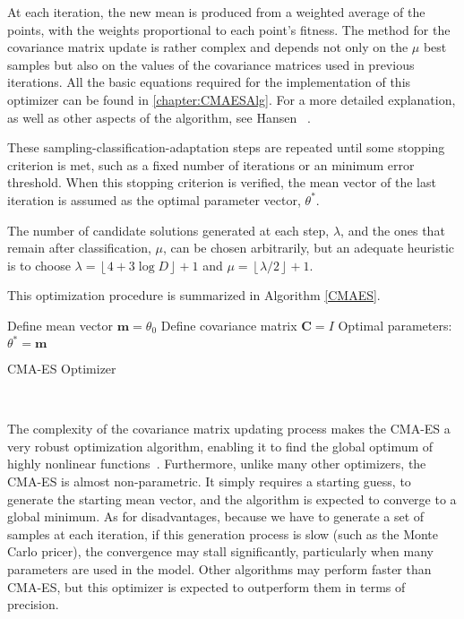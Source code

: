 At each iteration, the new mean is produced from a weighted average of the points, with the weights proportional to each point's fitness.
The method for the covariance matrix update is rather complex and depends not only on the $\mu$ best samples but also on the values of the covariance matrices used in previous iterations. All the basic equations required for the implementation of this optimizer can be found in \autoref{chapter:CMAESAlg}. For a more detailed explanation, as well as other aspects of the algorithm, see Hansen ~\citep{Hansen}.

These sampling-classification-adaptation steps are repeated until some stopping criterion is met, such as a fixed number of iterations or an minimum error threshold.
When this stopping criterion is verified, the mean vector of the last iteration is assumed as the optimal parameter vector, $\theta^{*}$.


The number of candidate solutions generated at each step, $\lambda$, and the ones that remain after classification, $\mu$, can be chosen arbitrarily, but an adequate heuristic is to choose $\lambda=\left\lfloor4+3\log D\right\rfloor+1$ and $\mu=\left\lfloor\lambda/2\right\rfloor+1$.

This optimization procedure is summarized in Algorithm \ref{CMAES}.

\begin{algorithm}[H]\label{CMAES}
\DontPrintSemicolon
Define mean vector $\mathbf{m}=\theta_0$
Define covariance matrix $\mathbf{C}=I$\;
 Optimal parameters: $\theta^{*}=\mathbf{m}$\;
 \caption{CMA-ES Optimizer}
\end{algorithm}
\

The complexity of the covariance matrix updating process makes the CMA-ES a very robust optimization algorithm, enabling it to find the global optimum of highly nonlinear functions~\citep{DilaoCMA}.
Furthermore, unlike many other optimizers, the CMA-ES is almost non-parametric. It simply requires a starting guess, to generate the starting mean vector, and the algorithm is expected to converge to a global minimum.
As for disadvantages, because we have to generate a set of samples at each iteration, if this generation process is slow (such as the Monte Carlo pricer), the convergence may stall significantly, particularly when many parameters are used in the model. Other algorithms may perform faster than CMA-ES, but this optimizer is expected to outperform them in terms of precision.

